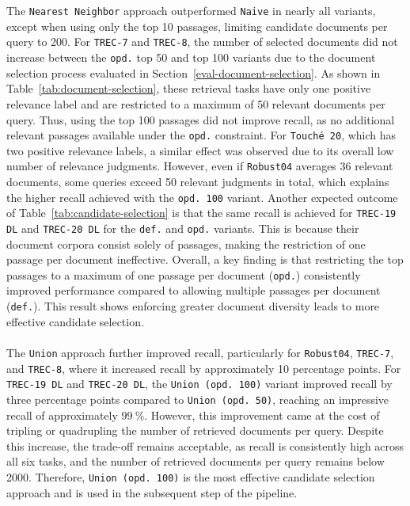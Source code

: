 \\\\
The \texttt{Nearest Neighbor} approach outperformed \texttt{Naive} in nearly all variants, except when using only the top 10 passages, limiting candidate documents per query to 200. For \texttt{TREC-7} and \texttt{TREC-8}, the number of selected documents did not increase between the \texttt{opd.} top 50 and top 100 variants due to the document selection process evaluated in Section~\ref{eval-document-selection}. As shown in Table~\ref{tab:document-selection}, these retrieval tasks have only one positive relevance label and are restricted to a maximum of 50 relevant documents per query. Thus, using the top 100 passages did not improve recall, as no additional relevant passages available under the \texttt{opd.} constraint. For \texttt{Touché 20}, which has two positive relevance labels, a similar effect was observed due to its overall low number of relevance judgments. However, even if \texttt{Robust04} averages 36 relevant documents, some queries exceed 50 relevant judgments in total, which explains the higher recall achieved with the \texttt{opd.\ 100} variant. Another expected outcome of Table~\ref{tab:candidate-selection} is that the same recall is achieved for \texttt{TREC-19 DL} and \texttt{TREC-20 DL} for the \texttt{def.} and \texttt{opd.} variants. This is because their document corpora consist solely of passages, making the restriction of one passage per document ineffective. Overall, a key finding is that restricting the top passages to a maximum of one passage per document (\texttt{opd.}) consistently improved performance compared to allowing multiple passages per document (\texttt{def.}). This result shows enforcing greater document diversity leads to more effective candidate selection. 
\\\\
The \texttt{Union} approach further improved recall, particularly for \texttt{Robust04}, \texttt{TREC-7}, and \texttt{TREC-8}, where it increased recall by approximately 10 percentage points. For \texttt{TREC-19 DL} and \texttt{TREC-20 DL}, the \texttt{Union (opd.\ 100)} variant improved recall by three percentage points compared to \texttt{Union (opd.\ 50)}, reaching an impressive recall of approximately $99~\%$. However, this improvement came at the cost of tripling or quadrupling the number of retrieved documents per query. Despite this increase, the trade-off remains acceptable, as recall is consistently high across all six tasks, and the number of retrieved documents per query remains below 2000. Therefore, \texttt{Union (opd.\ 100)} is the most effective candidate selection approach and is used in the subsequent step of the pipeline.


